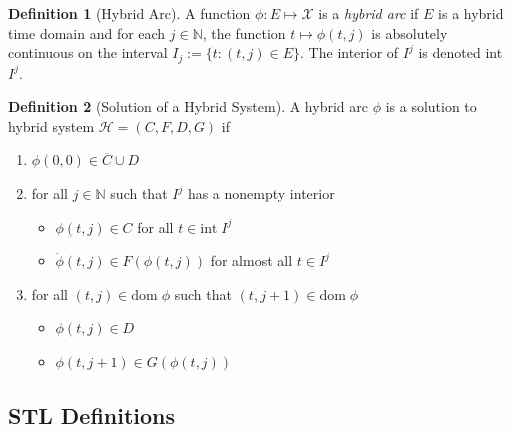\documentclass{article}
\theoremstyle{definition}
\newtheorem{definition}{Definition}[section]
\begin{document}
\begin{definition}[Hybrid Arc]

    A function $\phi: E\mapsto \mathcal{X}$ is a \textit{hybrid arc} if
    $E$ is a hybrid time domain and for each $j\in\mathbb{N}$, the function
    $t\mapsto\phi(t,j)$ is absolutely continuous on the interval $I_j :=
    \{t:(t,j)\in E\}$. The interior of $I^j$ is denoted int $I^j$.
\end{definition}

\begin{definition}[Solution of a Hybrid System]
    A hybrid arc $\phi$ is a solution to hybrid system $\mathcal{H}=(C,F,D,G)$ if
    \begin{enumerate}
        \item $\phi(0,0) \in \overline{C}\cup D$
        \item for all $j \in \mathbb{N}$ such that $I^j$ has a nonempty
           interior 
            \begin{itemize}[noitemsep,nolistsep]
                \item $\phi(t,j) \in C$ for all $t \in
                    \mathrm{int}\;I^j$
                \item $\dot{\phi}(t,j)\in F(\phi(t,j))$ for almost
                    all $t \in I^j$
            \end{itemize}
        \item for all $(t,j)\in \text{dom}\;\phi $ such that $(t,j+1)\in \text{dom}\;\phi$  
            \begin{itemize}[noitemsep,nolistsep]
                \item $\phi(t,j) \in D$
                \item $\phi(t,j+1) \in G(\phi(t,j))$
            \end{itemize}
    \end{enumerate}
\end{definition}



\subsection{STL Definitions} 

\end{document}
